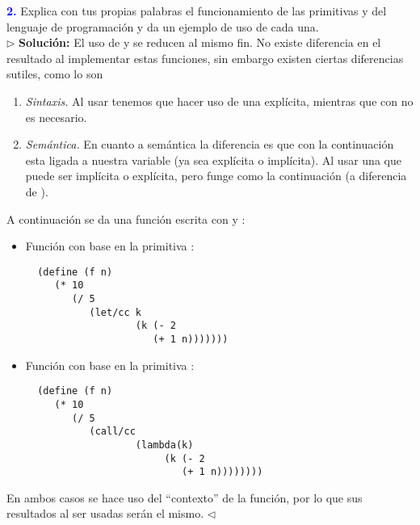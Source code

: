 \Large\textbf{\textcolor{blue}{2.}}
Explica con tus propias palabras el funcionamiento de las primitivas  y
 del lenguaje de programación  y da un ejemplo de uso de cada una.\\

$\rhd$ \textbf{Solución:} El uso de  y  se reducen al mismo fin.
No existe diferencia en el resultado al implementar estas funciones, sin embargo existen ciertas
diferencias sutiles, como lo son
\begin{enumerate}
\item \textit{Sintaxis.} Al usar  tenemos que hacer uso de una  explícita,
mientras que con  no es necesario.
\item \textit{Semántica.} En cuanto a semántica la diferencia es que con  la continuación
esta ligada a nuestra variable  (ya sea explícita o implícita). Al usar  una
 que puede ser implícita o explícita, pero funge como la continuación (a diferencia de ).
\end{enumerate}
A continuación se da una función escrita con  y :
\begin{itemize}
\item Función con base en la primitiva :
\begin{lstlisting}
  (define (f n)
     (* 10
        (/ 5
           (let/cc k
                   (k (- 2
                      (+ 1 n)))))))
\end{lstlisting}
\newpage
\item Función con base en la primitiva :
\begin{lstlisting}
  (define (f n)
     (* 10
        (/ 5
           (call/cc
                   (lambda(k)
                        (k (- 2
                           (+ 1 n))))))))
\end{lstlisting}
\end{itemize}
En ambos casos se hace uso del ``contexto'' de la función, por lo que sus resultados al ser usadas
serán el mismo.
\hfill $\lhd$
\newpage
